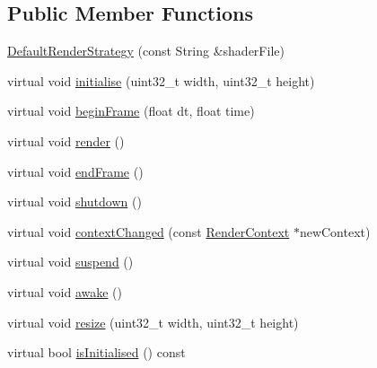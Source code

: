 \subsection*{\-Public \-Member \-Functions}
\begin{DoxyCompactItemize}
\item 
\hyperlink{class_verdi_1_1_default_render_strategy_a49d58b256fd8b44f4b9e6c447f016994}{\-Default\-Render\-Strategy} (const \-String \&shader\-File)
\item 
virtual void \hyperlink{class_verdi_1_1_default_render_strategy_a284ad8cfafde9fc659366dccd0f22da0}{initialise} (uint32\-\_\-t width, uint32\-\_\-t height)
\item 
virtual void \hyperlink{class_verdi_1_1_default_render_strategy_a186d48f6bc0fe41e735dd902a0729b9d}{begin\-Frame} (float dt, float time)
\item 
virtual void \hyperlink{class_verdi_1_1_default_render_strategy_aae18a8b90a6784bf6c6819fb7c35bbfb}{render} ()
\item 
virtual void \hyperlink{class_verdi_1_1_default_render_strategy_a4ed9758ee5fe08a584c38b025c1f2a1b}{end\-Frame} ()
\item 
virtual void \hyperlink{class_verdi_1_1_default_render_strategy_a2a55485421215ee88a5a6cc2bb66c169}{shutdown} ()
\item 
virtual void \hyperlink{class_verdi_1_1_default_render_strategy_ab5ad573e442e040cc60444ba4f8408d2}{context\-Changed} (const \hyperlink{class_verdi_1_1_render_context}{\-Render\-Context} $\ast$new\-Context)
\item 
virtual void \hyperlink{class_verdi_1_1_default_render_strategy_a3d4ad97fb6c44e760d7f9fb3e79d5813}{suspend} ()
\item 
virtual void \hyperlink{class_verdi_1_1_default_render_strategy_a3c6dbaa2ba1f5324cc87f1bc160a0487}{awake} ()
\item 
virtual void \hyperlink{class_verdi_1_1_default_render_strategy_a13ba3b975ba0eda5ff406a1d204944c6}{resize} (uint32\-\_\-t width, uint32\-\_\-t height)
\item 
virtual bool \hyperlink{class_verdi_1_1_default_render_strategy_a641e113e9224222f56d14c7a30edbf5a}{is\-Initialised} () const 
\end{DoxyCompactItemize}
